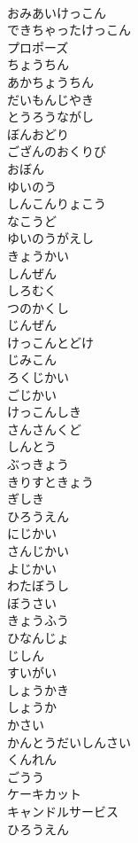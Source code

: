 \documentclass[8pt]{extreport}
\begin{document}
\begin{CJK}{UTF8}{min}
\\	おみあいけっこん
\\	できちゃったけっこん
\\	プロポーズ
\\	ちょうちん
\\	あかちょうちん
\\	だいもんじやき
\\	とうろうながし
\\	ぼんおどり
\\	ござんのおくりび
\\	おぼん
\\	ゆいのう
\\	しんこんりょこう
\\	なこうど
\\	ゆいのうがえし
\\	きょうかい
\\	しんぜん
\\	しろむく
\\	つのかくし
\\	じんぜん
\\	けっこんとどけ
\\	じみこん
\\	ろくじかい
\\	ごじかい
\\	けっこんしき
\\	さんさんくど
\\	しんとう
\\	ぶっきょう
\\	きりすときょう
\\	ぎしき
\\	ひろうえん
\\	にじかい
\\	さんじかい
\\	よじかい
\\	わたぼうし
\\	ぼうさい
\\	きょうふう
\\	ひなんじょ
\\	じしん
\\	すいがい
\\	しょうかき
\\	しょうか
\\	かさい
\\	かんとうだいしんさい
\\	くんれん
\\	ごうう
\\	ケーキカット
\\	キャンドルサービス
\\	ひろうえん

\end{CJK}
\end{document}

